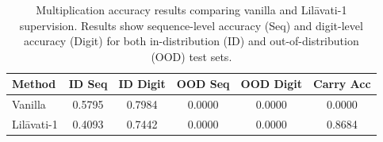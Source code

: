 \begin{table}[h]
\centering
\caption{Multiplication accuracy results comparing vanilla and Lil\={a}vati-1 supervision. Results show sequence-level accuracy (Seq) and digit-level accuracy (Digit) for both in-distribution (ID) and out-of-distribution (OOD) test sets.}
\label{tab:multiplication_results}
\begin{tabular}{lccccc}
\toprule
\textbf{Method} & \textbf{ID Seq} & \textbf{ID Digit} & \textbf{OOD Seq} & \textbf{OOD Digit} & \textbf{Carry Acc} \\
\midrule
Vanilla & 0.5795 & 0.7984 & 0.0000 & 0.0000 & 0.0000 \\
Lil\={a}vati-1 & 0.4093 & 0.7442 & 0.0000 & 0.0000 & 0.8684 \\
\bottomrule
\end{tabular}
\end{table}
